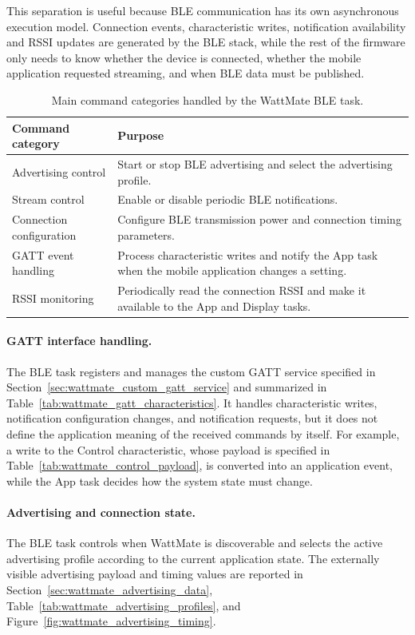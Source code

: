 This separation is useful because BLE communication has its own asynchronous execution model. Connection events, characteristic writes, notification availability and RSSI updates are generated by the BLE stack, while the rest of the firmware only needs to know whether the device is connected, whether the mobile application requested streaming, and when BLE data must be published.

\begin{table}[H]
	\centering
	\small
	\caption{Main command categories handled by the WattMate BLE task.}
	\label{tab:ble_task_commands}
	\begin{tabularx}{\textwidth}{lX}
		\toprule
		\textbf{Command category} & \textbf{Purpose} \\
		\midrule
		Advertising control 		& Start or stop BLE advertising and select the advertising profile. \\
		Stream control 				& Enable or disable periodic BLE notifications. \\
		Connection configuration	& Configure BLE transmission power and connection timing parameters. \\
		GATT event handling			& Process characteristic writes and notify the App task when the mobile application changes a setting. \\
		RSSI monitoring				& Periodically read the connection RSSI and make it available to the App and Display tasks. \\
		\bottomrule
	\end{tabularx}
\end{table}

\paragraph{GATT interface handling.} The BLE task registers and manages the custom GATT service specified in Section~\ref{sec:wattmate_custom_gatt_service} and summarized in Table~\ref{tab:wattmate_gatt_characteristics}. It handles characteristic writes, notification configuration changes, and notification requests, but it does not define the application meaning of the received commands by itself. For example, a write to the Control characteristic, whose payload is specified in Table~\ref{tab:wattmate_control_payload}, is converted into an application event, while the App task decides how the system state must change.

\paragraph{Advertising and connection state.}
The BLE task controls when WattMate is discoverable and selects the active advertising profile according to the current application state. 
The externally visible advertising payload and timing values are reported in Section~\ref{sec:wattmate_advertising_data}, Table~\ref{tab:wattmate_advertising_profiles}, and Figure~\ref{fig:wattmate_advertising_timing}.

